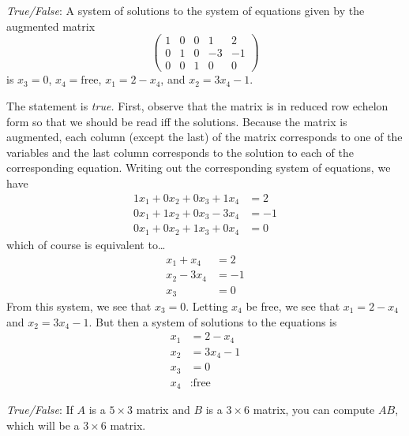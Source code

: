 \documentclass[11pt,letterpaper]{article}
\begin{document}
\quizsol \textit{True/False}: A system of solutions to the system of equations given by the augmented matrix
	\[
	\begin{pmatrix}
	1 & 0 & 0 & 1 & 2 \\
	0 & 1 & 0 & -3 & -1 \\
	0 & 0 & 1 & 0 & 0 
	\end{pmatrix}
	\]
is $x_3= 0$, $x_4= \text{free}$, $x_1= 2 - x_4$, and $x_2= 3x_4 - 1$. \pspace

\sol The statement is \textit{true.} First, observe that the matrix is in reduced row echelon form so that we should be read iff the solutions. Because the matrix is augmented, each column (except the last) of the matrix corresponds to one of the variables and the last column corresponds to the solution to each of the corresponding equation. Writing out the corresponding system of equations, we have
	\[
	\begin{aligned}
	1x_1 + 0x_2 + 0x_3 + 1x_4&= 2 \\
	0x_1 + 1x_2 + 0x_3 - 3x_4&= -1 \\
	0x_1 + 0x_2 + 1x_3 + 0x_4&= 0
	\end{aligned}
	\]
which of course is equivalent to\dots
	\[
	\begin{aligned}
	x_1 + x_4&= 2 \\
	x_2 - 3x_4&= -1 \\
	x_3&= 0
	\end{aligned}
	\]
From this system, we see that $x_3= 0$. Letting $x_4$ be free, we see that $x_1= 2 - x_4$ and $x_2= 3x_4 - 1$. But then a system of solutions to the equations is
	\[
	\begin{aligned}
	x_1&= 2 - x_4 \\
	x_2&= 3x_4 - 1 \\
	x_3&= 0 \\
	x_4&: \text{free}
	\end{aligned}
	\] \pvspace{1.5cm}



\quizsol \textit{True/False}: If $A$ is a $5 \times 3$ matrix and $B$ is a $3 \times 6$ matrix, you can compute $AB$, which will be a $3 \times 6$ matrix. \pspace
\end{document}
